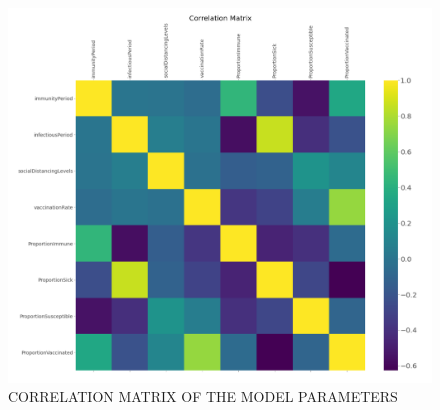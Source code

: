 \documentclass[smallextended]{svjour3}       %
\begin{document}
\begin{figure}
	\centering
	\includegraphics[width=0.7\linewidth]{figures/correlations.png}
	\caption{CORRELATION MATRIX OF THE MODEL PARAMETERS\label{fig:correlations}}
\end{figure}




\end{document}
